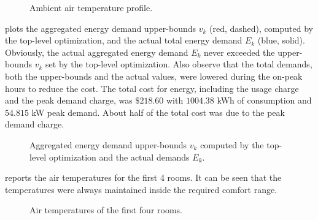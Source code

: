 \begin{figure}[tb]
  \centering
  
   \vspace{-8pt}
  \caption{Ambient air temperature profile.}
   \vspace{-8pt}
  \label{fig:simulation:ambient}
\end{figure}

 plots the aggregated energy demand upper-bounds $v_{k}$ (red, dashed), computed by the top-level optimization, and the actual total energy demand $E_{k}$ (blue, solid).
Obviously, the actual aggregated energy demand $E_{k}$ never exceeded the upper-bounds $v_{k}$ set by the top-level optimization.
Also observe that the total demands, both the upper-bounds and the actual values, were lowered during the on-peak hours to reduce the cost.
The total cost for energy, including the usage charge and the peak demand charge, was $\$218.60$ with $1004.38$ kWh of consumption and $54.815$ kW peak demand.
About half of the total cost was due to the peak demand charge.

\begin{figure}[tb]
  \centering
  
 \vspace{-8pt}
  \caption{Aggregated energy demand upper-bounds $v_{k}$ computed by the top-level optimization and the actual demands $E_{k}$.}
    \vspace{-10pt}
  \label{fig:simulation:demand}
\end{figure}


 reports the air temperatures for the first 4 rooms.
It can be seen that the temperatures were always maintained inside the required comfort range.

\begin{figure}[tb]
  \centering
  
  \caption{Air temperatures of the first four rooms.}
  \label{fig:simulation:temp}
\end{figure}


